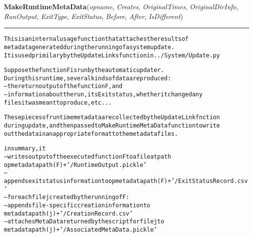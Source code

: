    \vspace{0.5ex}

\hspace{.8\funcindent}\begin{boxedminipage}{\funcwidth}

    \raggedright \textbf{MakeRuntimeMetaData}(\textit{opname}, \textit{Creates}, \textit{OriginalTimes}, \textit{OriginalDirInfo}, \textit{RunOutput}, \textit{ExitType}, \textit{ExitStatus}, \textit{Before}, \textit{After}, \textit{IsDifferent})

    \vspace{-1.5ex}

    \rule{\textwidth}{0.5\fboxrule}
\setlength{\parskip}{2ex}
\begin{alltt}

This is an internal usage function that attaches the results of 
metadata generated during the running of a system update.  
It is used primilary by the UpdateLinks function in ../System/Update.py

Suppose the function F is run by the automatic updater.   
During this runtime, several kinds of data are produced:  
--the return output of the function F, and 
--information about the run, its Exit status, whether it changed any 
        files it was meant to produce, etc...

These pieces of runtime metadata are collected by the UpdateLink fnction 
during update, and then passed to MakeRuntimeMetaData function to write 
out the data in an appropriate format to the metadata files. 

in summary, it
-- writes output of the executed function F to a file at path 
        opmetadatapath(F) + '/RuntimeOutput.pickle'
-- appends exit status information to opmetadatapath(F) + '/ExitStatusRecord.csv'
-- for each file j created by the running of F:
        -- appends file-specific creation information to 
        metadatapath(j) + '/CreationRecord.csv'
        -- attaches MetaData returned by the script for file j to
        metadatapath(j) + '/AssociatedMetaData.pickle'
\end{alltt}

\setlength{\parskip}{1ex}
    \end{boxedminipage}

    \label{System:MetaData:IsFailure}

    \vspace{0.5ex}

